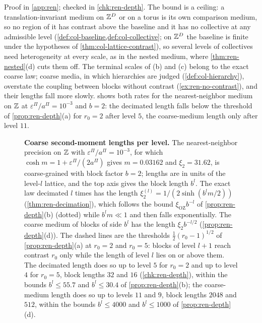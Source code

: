 Proof in \cref{app:ren}; checked in \cref{chk:ren-depth}. The bound is a ceiling: a translation-invariant medium on $\mathbb{Z}^D$ or on a torus is its own comparison medium, so no region of it has contrast above the baseline and it has no collective at any admissible level (\cref{def:col-baseline,def:col-collective}; on $\mathbb{Z}^D$ the baseline is finite under the hypotheses of \cref{thm:col-lattice-contrast}), so several levels of collectives need heterogeneity at every scale, as in the nested medium, where \cref{thm:ren-nested}(d) cuts them off. The terminal scales of (b) and (c) belong to the exact coarse law; coarse media, in which hierarchies are judged (\cref{def:col-hierarchy}), overstate the coupling between blocks without contrast (\cref{ex:ren-no-contrast}), and their lengths fall more slowly.  shows both rates for the nearest-neighbor medium on $\mathbb{Z}$ at $\varepsilon^\Pi/a^\Pi=10^{-3}$ and $b=2$: the decimated length falls below the threshold of \cref{prop:ren-depth}(a) for $r_0=2$ after level $5$, the coarse-medium length only after level $11$.

\begin{figure}[t]
  \centering
  
  \caption{\textbf{Coarse second-moment lengths per level.} The nearest-neighbor precision on $\mathbb{Z}$ with $\varepsilon^\Pi/a^\Pi=10^{-3}$, for which $\cosh m=1+\varepsilon^\Pi/(2a^\Pi)$ gives $m=0.03162$ and $\xi_2=31.62$, is coarse-grained with block factor $b=2$; lengths are in units of the level-$l$ lattice, and the top axis gives the block length $b^l$. The exact law decimated $l$ times has the length $\xi^{(l)}_2=1/(2\sinh(b^lm/2))$ (\cref{thm:ren-decimation}), which follows the bound $\xi_{\mathrm{OZ}}b^{-l}$ of \cref{prop:ren-depth}(b) (dotted) while $b^lm\ll1$ and then falls exponentially. The coarse medium of blocks of side $b^l$ has the length $\xi_2b^{-l/2}$ (\cref{prop:ren-depth}(d)). The dashed lines are the thresholds $\frac12(r_0-1)^{1/2}$ of \cref{prop:ren-depth}(a) at $r_0=2$ and $r_0=5$: blocks of level $l+1$ reach contrast $r_0$ only while the length of level $l$ lies on or above them. The decimated length does so up to level $5$ for $r_0=2$ and up to level $4$ for $r_0=5$, block lengths $32$ and $16$ (\cref{chk:ren-depth}), within the bounds $b^l\le55.7$ and $b^l\le30.4$ of \cref{prop:ren-depth}(b); the coarse-medium length does so up to levels $11$ and $9$, block lengths $2048$ and $512$, within the bounds $b^l\le4000$ and $b^l\le1000$ of \cref{prop:ren-depth}(d).}
  \label{fig:ren-lengths}
\end{figure}

